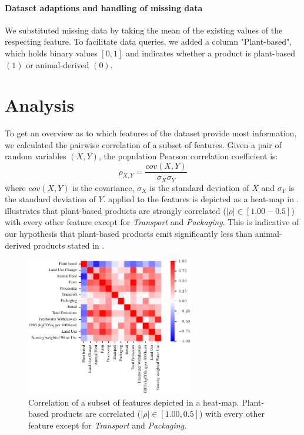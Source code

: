 \documentclass{article}
\begin{document}
\paragraph{Dataset adaptions and handling of missing data}

We substituted  missing  data by taking the mean of the existing values of the respecting feature. To facilitate data queries, we added a column "Plant-based", which holds binary values $[0,1]$ and indicates whether a product is plant-based $(1)$ or animal-derived $(0)$.


\section{Analysis}
\label{analysis}

To get an overview as to which features of the dataset provide most information, we calculated the pairwise correlation of a subset of features. Given a pair of random variables $(X,Y)$, the population Pearson correlation coefficient is: 
\begin{equation} \label{eq:corr}
  \rho_{X,Y} = \frac{cov(X,Y)}{\sigma_X \sigma_Y}
\end{equation}
where $cov(X,Y)$ is the covariance, $\sigma_X$ is the standard deviation of $X$ and $\sigma_Y$ is the standard deviation of $Y$.
 applied to the features is depicted  as a heat-map in  .   illustrates that
plant-based products are strongly correlated ($|\rho| \in [1.00 - 0.5]$) with every other feature except for \textit{Transport} and \textit{Packaging}. This is indicative of our hypothesis that plant-based products emit significantly less than animal-derived products stated in  .


\begin{figure}[h]
  \centering
  \includegraphics[width=0.65\textwidth]{figures/heat-map.pdf}
  \caption{Correlation of a subset of features depicted in a heat-map. Plant-based products are  correlated ($|\rho| \in [1.00, 0.5]$) with every other feature except for \textit{Transport} and \textit{Packaging}.}
  \label{fig:corr}
\end{figure}
\end{document}

